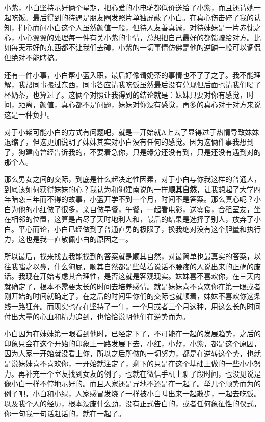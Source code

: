 \documentclass{article}
\begin{document}
小紫，小白坚持示好俩个星期，把心爱的小电驴都低价送给了小紫，而且还请她一起吃饭。最后得到的待遇是朋友圈发照片单独屏蔽了小白。在真心伤击碎了我的认知，扪心而问小白这个人虽然颜值一般，但待人友善真诚，对待妹妹是一片赤忱之心，小心翼翼的处理每一件有关小紫的事情，总想把自己最好的都馈赠给对方。比如每天示好的东西都不让我们去碰，小紫的一切事情仿佛是他的逆鳞一般可以调侃但绝对不能瞎搞。

还有一件小事，小白帮小蓝入职，最后好像请奶茶的事情也不了了之了。我不能理解，我帮同事搬过东西，同事答应请我吃饭虽然最后没有兑现但后面也请我们喝了杯奶茶，也算过了。这俩个对照让我得到的结论就是：妹妹只要对你有感觉，时间，距离，颜值，真心都不是问题，妹妹对你没有感觉，再多的真心对于对方来说这是一种负担。

对于小紫可能小白的方式有问题吧，就是一开始就A上去了显得过于热情导致妹妹退缩了，但这更加说明了妹妹其实对小白没有任何的感觉。因为这俩件事我想到了，狗建南曾经告诉我的，不要着急你，只是缘分还没有到，只是还没有遇到对的那个人。

那么男女之间的交际，到底是什么起决定性因素，对于小白与你我这样的普通人，到底该如何获得妹妹的心？我认为和狗建南说的一样\textbf{顺其自然}，让我想起了大学四年暗恋三年而不得的故事，小蓝开学不到一个月，时间不是答案。那么真心呢？小白为他的小红做了很多，亲自做早餐，午餐，一起看电影，送零食，合租室友，坐在相邻的位置，这算是占尽了天时地利人和，最后的结果是选择了别人，放弃了小白。平心而论，小白已经做到了普通直男的极限了，换我绝对没有这个胆量和执行力，这也是我一直敬佩小白的原因之一。

所以最后，找来找去我能找到的答案就是顺其自然，对最简单也最真实的答案，以往我嗤之以鼻，什么狗屁，顺其自然都是些站着说话不腰疼的人说出来的正确的废话。我现在开始考虑其合理性，是否这就是客观现实。妹妹喜不喜欢你，在三天内就确定了，根本不需要太长的时间去培养感情。就是妹妹喜不喜欢你在第一眼或者刚开始的时间就确定了，在之后的时间里你们的交际也就顺着，妹妹不喜欢你这条线一路狂奔。而现实也存在坚持了一年，一个月或者三个月这种，用这么长的时间付出大量的心血和精力追到，也恰恰说明他们在逆势而为。

小白因为在妹妹第一眼看到他时，已经定下了，不可能在一起的发展趋势，之后的印象只会在这个开始的印象上一路发展下去，小红，小蓝，小紫，都是这个原因，因为人家一开始就没看上你，所以之后所做的一切努力，都是在逆转这个势，也就是说妹妹喜不喜欢你，一开始就注定了，剩下的只是在这个基础上做的一些小小努力。再补充一个室友找到女友的例子，也就在微信手机上聊了段时间，也没见说是像小白一样不停地示好的。而且人家还是异地不还是在一起了。举几个顺势而为的例子吧，小白和小绿，人家感冒发烧了一样被小白叫出来一起散步，一起去吃饭。以及我个人的经历，根本没废什么劲，没有正式告白的，或者任何象征性的仪式，你一句我一句话赶话的，就在一起了。
\end{document}
